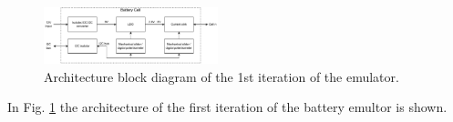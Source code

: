 \begin{figure}[!th]
    \begin{center}
        \includegraphics[width=0.45\textwidth]{Battery_cell_diagram-Single_cell.pdf}
    \end{center}
    \caption{Architecture block diagram of the 1st iteration of the emulator.}
    \label{fig:1st_architecture}
\end{figure}

In Fig. \ref{fig:1st_architecture} the architecture of the first iteration 
of the battery emultor is shown.